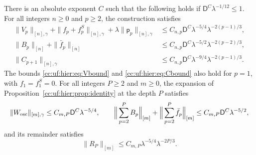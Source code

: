 \begin{theorem}\label{cc:uf:hier:thm:depth}
There is an absolute exponent $C$ such that the following holds if
$\mathsf D^C\lambda^{-1/12}\le1$. For all integers \(n\ge0\) and
\(p\ge2\), the construction satisfies
\begin{align}
 \|V_p\|_{[n],\gamma}+\|f_p+f_p^S\|_{[n],\gamma}
        +\lambda\|\mathsf p_p\|_{[n],\gamma}
 &\le C_{n,p}\mathsf D^C\lambda^{-5/4}\lambda^{-2(p-1)/3},
 \label{cc:uf:hier:eq:Vbound}\\
 \|B_p\|_{[n]}+\|\bar f_p\|_{[n]}
 &\le C_{n,p}\mathsf D^C\lambda^{-5/2}\lambda^{-2(p-2)/3},
 \label{cc:uf:hier:eq:Bbound}\\
 \|C_{p+1}\|_{[n],\gamma}
 &\le C_{n,p}\mathsf D^C\lambda^{-9/4}\lambda^{-2(p-1)/3}.
 \label{cc:uf:hier:eq:Cbound}
\end{align}
The bounds \eqref{cc:uf:hier:eq:Vbound} and
\eqref{cc:uf:hier:eq:Cbound} also hold for $p=1$, with $f_1=f_1^S=0$.
For all integers \(P\ge2\) and \(m\ge0\), the expansion of
Proposition~\ref{cc:uf:hier:prop:identity} at the depth $P$ satisfies
\begin{equation}\label{cc:uf:hier:eq:sum}
 \|W_{\rm osc}\|_{[m],\gamma}\le C_{m,P}\mathsf D^C\lambda^{-5/4},\qquad
 \Big\|\sum_{p=2}^PB_p\Big\|_{[m]}+\Big\|\sum_{p=2}^P\bar f_p\Big\|_{[m]}
 \le C_{m,P}\mathsf D^C\lambda^{-5/2},
\end{equation}
and its remainder satisfies
\begin{equation}\label{cc:uf:hier:eq:tail-est}
 \|R_P\|_{[m]}\le C_{m,P}\lambda^{-5/4}\lambda^{-2P/3}.
\end{equation}
\end{theorem}
